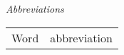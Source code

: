\thispagestyle{plain}
\begin{center}
    \LARGE{\emph{Abbreviations}}
\end{center}
\vspace{1cm}
\begin{center}
	\begin{tabular}{ll}
		Word & abbreviation \\
	\end{tabular}
\end{center}
